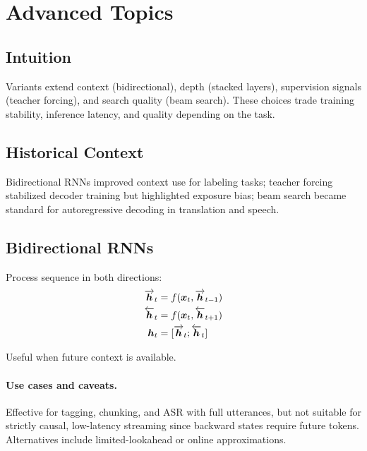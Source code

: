 
\section{Advanced Topics }
\label{sec:rnn-advanced}

\subsection*{Intuition}

Variants extend context (bidirectional), depth (stacked layers), supervision signals (teacher forcing), and search quality (beam search). These choices trade training stability, inference latency, and quality depending on the task.

\subsection*{Historical Context}

Bidirectional RNNs improved context use for labeling tasks; teacher forcing stabilized decoder training but highlighted exposure bias; beam search became standard for autoregressive decoding in translation and speech.


\subsection{Bidirectional RNNs}

Process sequence in both directions:
\begin{align}
\overrightarrow{\boldsymbol{h}}_t &= f(\boldsymbol{x}_t, \overrightarrow{\boldsymbol{h}}_{t-1}) \\
\overleftarrow{\boldsymbol{h}}_t &= f(\boldsymbol{x}_t, \overleftarrow{\boldsymbol{h}}_{t+1}) \\
\boldsymbol{h}_t &= [\overrightarrow{\boldsymbol{h}}_t; \overleftarrow{\boldsymbol{h}}_t]
\end{align}

Useful when future context is available.

\paragraph{Use cases and caveats.} Effective for tagging, chunking, and ASR with full utterances, but not suitable for strictly causal, low-latency streaming since backward states require future tokens. Alternatives include limited-lookahead or online approximations.

